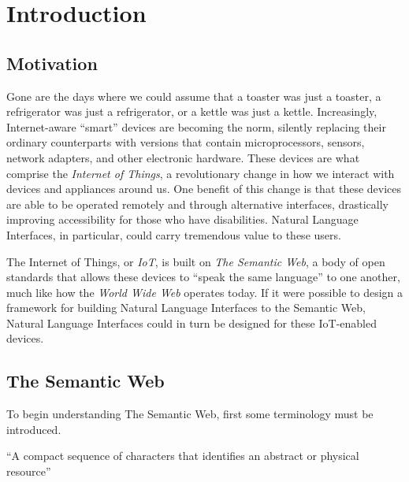 \documentclass[../main.tex]{subfiles}
\begin{document}
\chapter{Introduction}


\section{Motivation}

Gone are the days where we could assume that a toaster was just a toaster, a refrigerator was just a refrigerator, or a kettle was just a kettle.
Increasingly, Internet-aware ``smart'' devices are becoming the norm, silently replacing their ordinary counterparts with versions that contain microprocessors,
sensors, network adapters, and other electronic hardware. These devices are what comprise the {\em Internet of Things}, a revolutionary change in how we interact with devices and appliances around us.  One benefit of this change is that these devices are able to be operated remotely and through alternative interfaces, drastically
improving accessibility for those who have disabilities.  Natural Language Interfaces, in particular, could carry tremendous value to these users.

The Internet of Things, or {\em IoT}, is built on {\em The Semantic Web}, a body of open standards that allows these devices to ``speak the same language'' to one another, much
like how the {\em World Wide Web} operates today\cite{semwebanalogy}.  If it were possible to design a framework for building Natural Language Interfaces to the Semantic Web,
Natural Language Interfaces could in turn be designed for these IoT-enabled devices.



\section{The Semantic Web}

To begin understanding The Semantic Web, first some terminology must be introduced.

\begin{definition}
	``A compact sequence of characters that identifies an abstract or physical resource''\cite{w3curi}
\end{definition}
\end{document}
